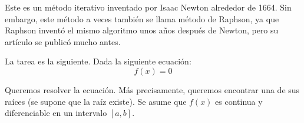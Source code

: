 Este es un método iterativo inventado por Isaac Newton alrededor de 1664. Sin embargo, este método a veces también se llama método de Raphson, ya que Raphson inventó el mismo algoritmo unos años después de Newton, pero su artículo se publicó mucho antes.

La tarea es la siguiente. Dada la siguiente ecuación: 
$$f(x) = 0$$

Queremos resolver la ecuación. Más precisamente, queremos encontrar una de sus raíces (se supone que la raíz existe). Se asume que $f(x)$ es continua y diferenciable en un intervalo $[a,b]$.